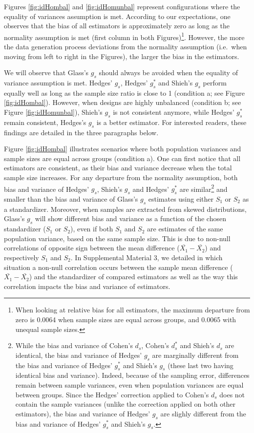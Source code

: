 \documentclass[
  english,
  man,floatsintext]{apa6}
\begin{document}
Figures \ref{fig:idHombal} and \ref{fig:idHomunbal} represent configurations where the equality of variances assumption is met. According to our expectations, one observes that the bias of all estimators is approximately zero as long as the normality assumption is met (first column in both Figures)\footnote{When looking at relative bias for all estimators, the maximum departure from zero is 0.0064 when sample sizes are equal across groups, and 0.0065 with unequal sample sizes.}. However, the more the data generation process deviations from the normality assumption (i.e.~when moving from left to right in the Figures), the larger the bias in the estimators.

We will observe that Glass's \(g_s\) should always be avoided when the equality of variance assumption is met. Hedges' \(g_s\), Hedges' \(g^*_s\) and Shieh's \(g_s\) perform equally well as long as the sample size ratio is close to 1 (condition a; see Figure \ref{fig:idHombal}). However, when designs are highly unbalanced (condition b; see Figure \ref{fig:idHomunbal}), Shieh's \(g_s\) is not consistent anymore, while Hedges' \(g^*_s\) remain consistent, Hedges's \(g_s\) is a better estimator. For interested readers, these findings are detailed in the three paragraphs below.

Figure \ref{fig:idHombal} illustrates scenarios where both population variances and sample sizes are equal across groups (condition a). One can first notice that all estimators are consistent, as their bias and variance decrease when the total sample size increases. For any departure from the normality assumption, both bias and variance of Hedges' \(g_s\), Shieh's \(g_s\) and Hedges' \(g^*_s\) are similar\footnote{While the bias and variance of Cohen's $d_s$, Cohen's $d^*_s$ and Shieh's $d_s$ are identical, the bias and variance of Hedges' $g_s$ are marginally different from the bias and variance of Hedges' $g^*_s$ and Shieh's $g_s$ (these last two having identical bias and variance). Indeed, because of the sampling error, differences remain between sample variances, even when population variances are equal between groups. Since the Hedges' correction applied to Cohen's $d_s$ does not contain the sample variances (unlike the correction applied on both other estimators), the bias and variance of Hedges' $g_s$ are slighly different from the bias and variance of Hedges' $g^*_s$ and Shieh's $g_s$.} and smaller than the bias and variance of Glass's \(g_s\) estimates using either \(S_1\) or \(S_2\) as a standardizer. Moreover, when samples are extracted from skewed distributions, Glass's \(g_s\) will show different bias and variance as a function of the chosen standardizer (\(S_1\) or \(S_2\)), even if both \(S_1\) and \(S_2\) are estimates of the same population variance, based on the same sample size. This is due to non-null correlations of opposite sign between the mean difference (\(\bar{X_1}-\bar{X_2}\)) and respectively \(S_1\) and \(S_2\). In Supplemental Material 3, we detailed in which situation a non-null correlation occurs between the sample mean difference (\(\bar{X_1}-\bar{X_2}\)) and the standardizer of compared estimators as well as the way this correlation impacts the bias and variance of estimators.
\end{document}
